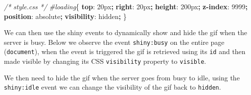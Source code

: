 \documentclass[
]{krantz}
\makeatletter
\newenvironment{Shaded}{\begin{snugshade}}{\end{snugshade}}
\newcommand{\AttributeTok}[1]{\textcolor[rgb]{0.61,0.61,0.61}{#1}}
\newcommand{\BuiltInTok}[1]{#1}
\newcommand{\CommentTok}[1]{\textcolor[rgb]{0.37,0.37,0.37}{\textit{#1}}}
\newcommand{\DataTypeTok}[1]{\textcolor[rgb]{0.27,0.27,0.27}{#1}}
\newcommand{\DecValTok}[1]{\textcolor[rgb]{0.06,0.06,0.06}{#1}}
\newcommand{\FunctionTok}[1]{\textcolor[rgb]{0,0,0}{#1}}
\newcommand{\KeywordTok}[1]{\textcolor[rgb]{0.27,0.27,0.27}{\textbf{#1}}}
\newcommand{\NormalTok}[1]{#1}
\newcommand{\OperatorTok}[1]{\textcolor[rgb]{0.43,0.43,0.43}{\textbf{#1}}}
\newcommand{\PreprocessorTok}[1]{\textcolor[rgb]{0.37,0.37,0.37}{\textit{#1}}}
\newcommand{\StringTok}[1]{\textcolor[rgb]{0.5,0.5,0.5}{#1}}
\newenvironment{kframe}{%
\medskip{}
\setlength{\fboxsep}{.8em}
 \def\at@end@of@kframe{}%
 \ifinner\ifhmode%
  \def\at@end@of@kframe{\end{minipage}}%
  \begin{minipage}{\columnwidth}%
 \fi\fi%
 \def\FrameCommand##1{\hskip\@totalleftmargin \hskip-\fboxsep
 \colorbox{shadecolor}{##1}\hskip-\fboxsep
     \hskip-\linewidth \hskip-\@totalleftmargin \hskip\columnwidth}%
 \MakeFramed {\advance\hsize-\width
   \@totalleftmargin\z@ \linewidth\hsize
   \@setminipage}}%
 {\par\unskip\endMakeFramed%
 \at@end@of@kframe}
\renewenvironment{Shaded}{\begin{kframe}}{\end{kframe}}
\makeatother
\begin{document}
\begin{Shaded}
\begin{Highlighting}[]
\CommentTok{/* style.css */}
\PreprocessorTok{\#loading}\NormalTok{\{}
  \KeywordTok{top}\NormalTok{: }\DecValTok{20}\DataTypeTok{px}\OperatorTok{;}
  \KeywordTok{right}\NormalTok{: }\DecValTok{20}\DataTypeTok{px}\OperatorTok{;}
  \KeywordTok{height}\NormalTok{: }\DecValTok{200}\DataTypeTok{px}\OperatorTok{;}
  \KeywordTok{z{-}index}\NormalTok{: }\DecValTok{9999}\OperatorTok{;}
  \KeywordTok{position}\NormalTok{: }\DecValTok{absolute}\OperatorTok{;}
  \KeywordTok{visibility}\NormalTok{: }\DecValTok{hidden}\OperatorTok{;}
\NormalTok{\}}
\end{Highlighting}
\end{Shaded}

We can then use the shiny events to dynamically show and hide the gif when the server is busy. Below we observe the event \texttt{shiny:busy} on the entire page (\texttt{document}), when the event is triggered the gif is retrieved using its \texttt{id} and then made visible by changing its CSS \texttt{visibility} property to \texttt{visible}.

\begin{Shaded}
\end{Shaded}

We then need to hide the gif when the server goes from busy to idle, using the \texttt{shiny:idle} event we can change the visibility of the gif back to \texttt{hidden}.
\end{document}

